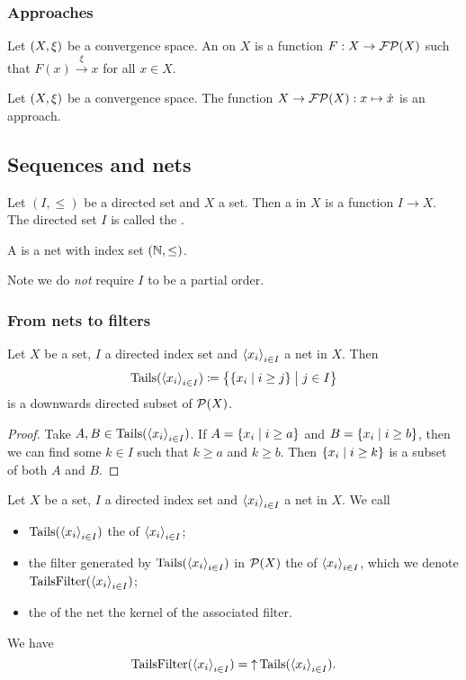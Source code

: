 \subsubsection{Approaches}
\begin{definition}
Let $\left( X,\xi \right)$ be a convergence space. An  on $X$ is a function $F: X\to \operatorname{\mathcal{FP}}(X)$ such that $F(x) \overset{\xi}{\longrightarrow} x$ for all $x\in X$.
\end{definition}

\begin{lemma}
Let $\left( X,\xi \right)$ be a convergence space. The function $X\to \operatorname{\mathcal{FP}}(X): x\mapsto \dot{x}$ is an approach.
\end{lemma}

\subsection{Sequences and nets}
\begin{definition}
Let $(I,\leq)$ be a directed set and $X$ a set. Then a  in $X$ is a function $I\to X$. The directed set $I$ is called the .

A  is a net with index set $\left( \mathbb{N}, \leq \right)$.
\end{definition}
Note we do \emph{not} require $I$ to be a partial order.

\subsubsection{From nets to filters}
\begin{lemma} \label{tailsDownwardsDirected}
Let $X$ be a set, $I$ a directed index set and $\left\langle x_i \right\rangle_{i\in I}$ a net in $X$. Then
\[ \Tails(\seq{x_i}_{i\in I}) \defeq \setbuilder[\big]{\setbuilder{x_i}{i \geq j}}{j\in I} \]
is a downwards directed subset of $\operatorname{\mathcal{P}}(X)$.
\end{lemma}
\begin{proof}
Take $A,B\in \operatorname{Tails}(\left\langle x_i \right\rangle_{i\in I})$. If $A = \setbuilder{x_i}{i \geq a}$ and $B = \setbuilder{x_i}{i \geq b}$, then we can find some $k\in I$ such that $k \geq a$ and $k\geq b$. Then $\setbuilder{x_i}{i \geq k}$ is a subset of both $A$ and $B$.
\end{proof}

\begin{definition}
Let $X$ be a set, $I$ a directed index set and $\left\langle x_i \right\rangle_{i\in I}$ a net in $X$. We call
\begin{itemize}
\item $\operatorname{Tails}(\left\langle x_i \right\rangle_{i\in I})$ the  of $\left\langle x_i \right\rangle_{i\in I}$;
\item the filter generated by $\operatorname{Tails}(\left\langle x_i \right\rangle_{i\in I})$ in $\operatorname{\mathcal{P}}(X)$ the  of $\left\langle x_i \right\rangle_{i\in I}$, which we denote $\operatorname{TailsFilter}(\left\langle x_i \right\rangle_{i\in I})$;
\item the  of the net the kernel of the associated filter.
\end{itemize}
We have 
\[ \operatorname{TailsFilter}(\left\langle x_i \right\rangle_{i\in I}) = \operatorname{\uparrow} \operatorname{Tails}(\left\langle x_i \right\rangle_{i\in I}). \]
\end{definition}

